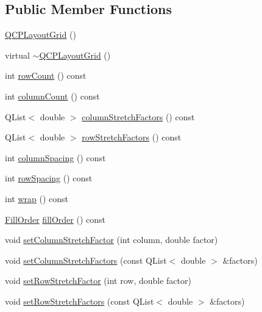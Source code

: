 \subsection*{Public Member Functions}
\begin{DoxyCompactItemize}
\item 
\mbox{\hyperlink{class_q_c_p_layout_grid_ab2a4c1587dc8aed4c41c509c8d8d2a64}{Q\+C\+P\+Layout\+Grid}} ()
\item 
virtual \mbox{\hyperlink{class_q_c_p_layout_grid_af859f4a4db693a21056a9e615f6c4a90}{$\sim$\+Q\+C\+P\+Layout\+Grid}} ()
\item 
int \mbox{\hyperlink{class_q_c_p_layout_grid_a19c66fd76cbce58a8e94f33797e0c0aa}{row\+Count}} () const
\item 
int \mbox{\hyperlink{class_q_c_p_layout_grid_a1a2962cbf45011405b64b913afa8e7a2}{column\+Count}} () const
\item 
Q\+List$<$ double $>$ \mbox{\hyperlink{class_q_c_p_layout_grid_a8e0e587c386bbcd1b94119f5f44c512d}{column\+Stretch\+Factors}} () const
\item 
Q\+List$<$ double $>$ \mbox{\hyperlink{class_q_c_p_layout_grid_aa33408586427e77e05f79defde7f3568}{row\+Stretch\+Factors}} () const
\item 
int \mbox{\hyperlink{class_q_c_p_layout_grid_adcf4c387d5996bf6e4ae0ed26138247e}{column\+Spacing}} () const
\item 
int \mbox{\hyperlink{class_q_c_p_layout_grid_a4cb6c680505cd0ce6f85b9e217fd2cd0}{row\+Spacing}} () const
\item 
int \mbox{\hyperlink{class_q_c_p_layout_grid_a8bb71b52b2796c9f05fae6a32d2d0efd}{wrap}} () const
\item 
\mbox{\hyperlink{class_q_c_p_layout_grid_a7d49ee08773de6b2fd246edfed353cca}{Fill\+Order}} \mbox{\hyperlink{class_q_c_p_layout_grid_a6cb6563a13759222ad92ae397bd6c27e}{fill\+Order}} () const
\item 
void \mbox{\hyperlink{class_q_c_p_layout_grid_ae38f31a71687b9d7ee3104852528fb50}{set\+Column\+Stretch\+Factor}} (int column, double factor)
\item 
void \mbox{\hyperlink{class_q_c_p_layout_grid_a6c2591d1a7e2534ce036989543b49e57}{set\+Column\+Stretch\+Factors}} (const Q\+List$<$ double $>$ \&factors)
\item 
void \mbox{\hyperlink{class_q_c_p_layout_grid_a7b0273de5369bd93d942edbaf5b166ec}{set\+Row\+Stretch\+Factor}} (int row, double factor)
\item 
void \mbox{\hyperlink{class_q_c_p_layout_grid_a200b45f9c908f96ebadaa3c8d87a2782}{set\+Row\+Stretch\+Factors}} (const Q\+List$<$ double $>$ \&factors)

\end{DoxyCompactItemize}
